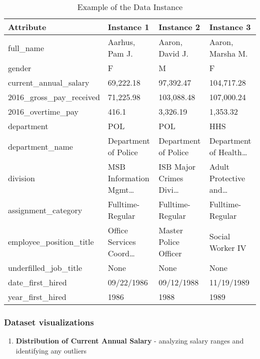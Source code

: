 \documentclass[11pt]{article}
\providecommand{\tightlist}{%
      \setlength{\itemsep}{0pt}\setlength{\parskip}{0pt}}
\begin{document}
    
\begin{table}[h]
    \centering
    \begin{tabular}{@{}p{5cm} p{3cm} p{3cm} p{3cm}@{}}
    \toprule
    \textbf{Attribute} & \textbf{Instance 1} & \textbf{Instance 2} & \textbf{Instance 3} \\
    \midrule
    full\_name & Aarhus, Pam J. & Aaron, David J. & Aaron, Marsha M. \\
    gender & F & M & F \\
    current\_annual\_salary & 69,222.18 & 97,392.47 & 104,717.28 \\
    2016\_gross\_pay\_received & 71,225.98 & 103,088.48 & 107,000.24 \\
    2016\_overtime\_pay & 416.1 & 3,326.19 & 1,353.32 \\
    department & POL & POL & HHS \\
    department\_name & Department of Police & Department of Police & Department of Health\ldots \\
    division & MSB Information Mgmt\ldots & ISB Major Crimes Divi\ldots & Adult Protective and\ldots \\
    assignment\_category & Fulltime-Regular & Fulltime-Regular & Fulltime-Regular \\
    employee\_position\_title & Office Services Coord\ldots & Master Police Officer & Social Worker IV \\
    underfilled\_job\_title & None & None & None \\
    date\_first\_hired & 09/22/1986 & 09/12/1988 & 11/19/1989 \\
    year\_first\_hired & 1986 & 1988 & 1989 \\
    \bottomrule
    \end{tabular}
    \caption{Example of the Data Instance}
    \label{tab:data_instance}
    \end{table}

    
    \subsubsection{Dataset visualizations}\label{dataset-visualizations}

\begin{enumerate}
\def\labelenumi{\arabic{enumi}.}
\tightlist
\item
  \textbf{Distribution of Current Annual Salary} - analyzing salary
  ranges and identifying any outliers
\end{enumerate}
\end{document}
